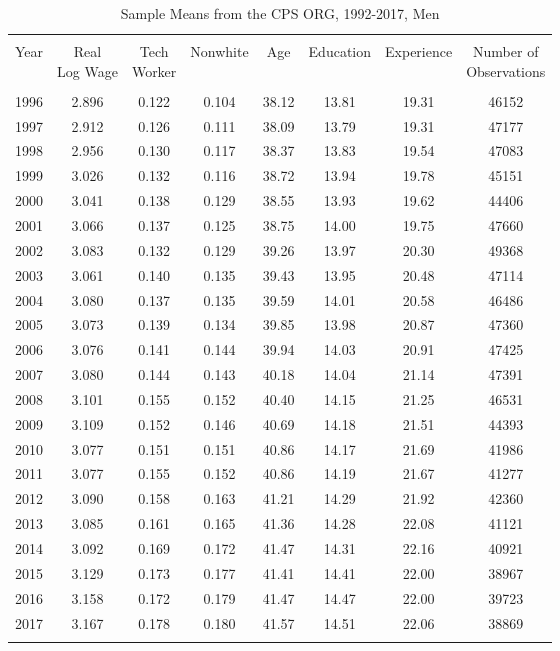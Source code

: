 
\begin{table}[!htbp] \centering 
  \caption{Sample Means from the CPS ORG, 1992-2017, Men} 
  \label{tab:tab_org_summary_men} 
\begin{tabular}{@{\extracolsep{5pt}} cccccccc} 
\\[-1.8ex]\hline 
\hline \\[-1.8ex] 
Year & \thead{Real \\ Log Wage} & \thead{Tech \\ Worker} & Nonwhite & Age & Education & Experience & \thead{Number of \\ Observations} \\ 
\hline \\[-1.8ex] 
1996 & 2.896 & 0.122 & 0.104 & 38.12 & 13.81 & 19.31 & 46152 \\ 
1997 & 2.912 & 0.126 & 0.111 & 38.09 & 13.79 & 19.31 & 47177 \\ 
1998 & 2.956 & 0.130 & 0.117 & 38.37 & 13.83 & 19.54 & 47083 \\ 
1999 & 3.026 & 0.132 & 0.116 & 38.72 & 13.94 & 19.78 & 45151 \\ 
2000 & 3.041 & 0.138 & 0.129 & 38.55 & 13.93 & 19.62 & 44406 \\ 
2001 & 3.066 & 0.137 & 0.125 & 38.75 & 14.00 & 19.75 & 47660 \\ 
2002 & 3.083 & 0.132 & 0.129 & 39.26 & 13.97 & 20.30 & 49368 \\ 
2003 & 3.061 & 0.140 & 0.135 & 39.43 & 13.95 & 20.48 & 47114 \\ 
2004 & 3.080 & 0.137 & 0.135 & 39.59 & 14.01 & 20.58 & 46486 \\ 
2005 & 3.073 & 0.139 & 0.134 & 39.85 & 13.98 & 20.87 & 47360 \\ 
2006 & 3.076 & 0.141 & 0.144 & 39.94 & 14.03 & 20.91 & 47425 \\ 
2007 & 3.080 & 0.144 & 0.143 & 40.18 & 14.04 & 21.14 & 47391 \\ 
2008 & 3.101 & 0.155 & 0.152 & 40.40 & 14.15 & 21.25 & 46531 \\ 
2009 & 3.109 & 0.152 & 0.146 & 40.69 & 14.18 & 21.51 & 44393 \\ 
2010 & 3.077 & 0.151 & 0.151 & 40.86 & 14.17 & 21.69 & 41986 \\ 
2011 & 3.077 & 0.155 & 0.152 & 40.86 & 14.19 & 21.67 & 41277 \\ 
2012 & 3.090 & 0.158 & 0.163 & 41.21 & 14.29 & 21.92 & 42360 \\ 
2013 & 3.085 & 0.161 & 0.165 & 41.36 & 14.28 & 22.08 & 41121 \\ 
2014 & 3.092 & 0.169 & 0.172 & 41.47 & 14.31 & 22.16 & 40921 \\ 
2015 & 3.129 & 0.173 & 0.177 & 41.41 & 14.41 & 22.00 & 38967 \\ 
2016 & 3.158 & 0.172 & 0.179 & 41.47 & 14.47 & 22.00 & 39723 \\ 
2017 & 3.167 & 0.178 & 0.180 & 41.57 & 14.51 & 22.06 & 38869 \\ 
\hline \\[-1.8ex] 
\end{tabular} 
\end{table} 
